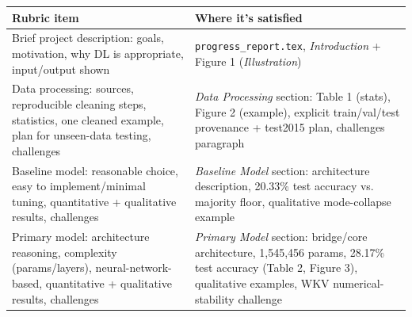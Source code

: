 \documentclass[final]{article}
\begin{document}
\begin{longtable}{p{6.5cm}p{7.7cm}}
\toprule
Rubric item & Where it's satisfied \\
\midrule
\endhead
Brief project description: goals, motivation, why DL is appropriate, input/output shown & \texttt{progress\_report.tex}, \emph{Introduction} + Figure 1 (\emph{Illustration}) \\
Data processing: sources, reproducible cleaning steps, statistics, one cleaned example, plan for unseen-data testing, challenges & \emph{Data Processing} section: Table 1 (stats), Figure 2 (example), explicit train/val/test provenance + test2015 plan, challenges paragraph \\
Baseline model: reasonable choice, easy to implement/minimal tuning, quantitative + qualitative results, challenges & \emph{Baseline Model} section: architecture description, 20.33\% test accuracy vs. majority floor, qualitative mode-collapse example \\
Primary model: architecture reasoning, complexity (params/layers), neural-network-based, quantitative + qualitative results, challenges & \emph{Primary Model} section: bridge/core architecture, 1{,}545{,}456 params, 28.17\% test accuracy (Table 2, Figure 3), qualitative examples, WKV numerical-stability challenge \\
\bottomrule
\end{longtable}
\end{document}

